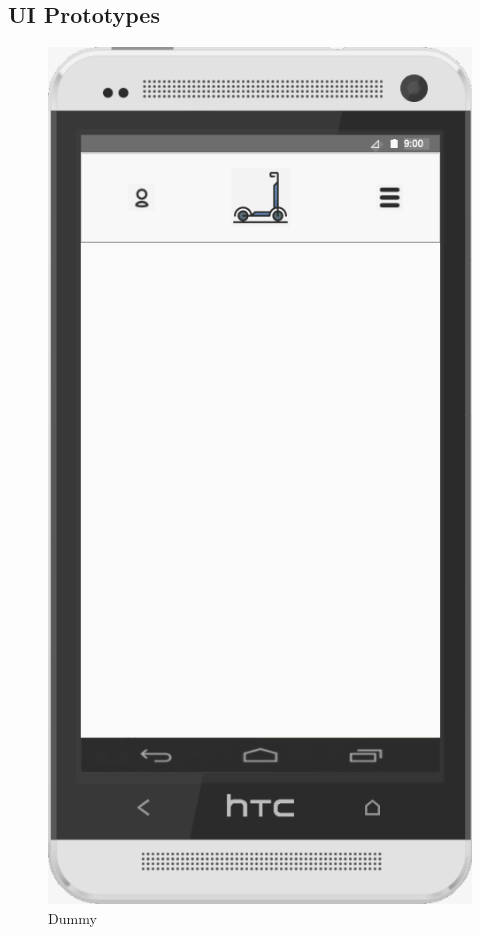 \documentclass[a4paper, 12pt]{article}
\begin{document}
\newpage
\subsection{UI Prototypes}
\begin{figure} [htbp]
  \begin{center}
    \includegraphics[scale=0.5]{images/prototypes/01-dummy.png}
  \end{center}
  \caption{Dummy}
\end{figure}
\end{document}

